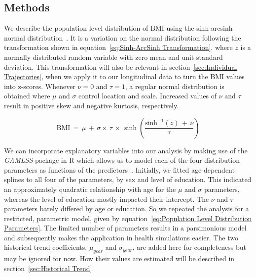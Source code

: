 \documentclass{imammb}
\numberwithin{equation}{section}
\begin{document}
\subsection{Methods}
\label{sec:Population Level Distribution/Methods}

We describe the population level distribution of BMI using the sinh-arcsinh normal distribution~\citep{Jones2009, Jones2019}. It is a variation on the normal distribution following the transformation shown in equation~\ref{eq:Sinh-ArcSinh Transformation}, where $z$ is a normally distributed random variable with zero mean and unit standard deviation. This transformation will also be relevant in section~\ref{sec:Individual Trajectories}, when we apply it to our longitudinal data to turn the BMI values into z-scores. Whenever $\nu = 0$ and $\tau =  1$, a regular normal distribution is obtained where $\mu$ and $\sigma$ control location and scale. Increased values of $\nu$ and $\tau$ result in positive skew and negative kurtosis, respectively.

\vspace{-3mm}

\begin{equation}
\label{eq:Sinh-ArcSinh Transformation}
\text{BMI} \, = \, \mu \, + \, \sigma \times \, \tau \, \times \, \sinh \left(\frac{\text{sinh}^{-1}(z) \, + \, \nu}{\tau}\right)
\end{equation}

\vspace{1mm}

We can incorporate explanatory variables into our analysis by making use of the \textit{GAMLSS} package in R which allows us to model each of the four distribution parameters as functions of the predictors~\citep{Rigby2005, Stasinopoulos2007, R2021}. Initially, we fitted age-dependent splines to all four of the parameters, by sex and level of education. This indicated an approximately quadratic relationship with age for the $\mu$ and $\sigma$ parameters, whereas the level of education mostly impacted their intercept. The $\nu$ and $\tau$ parameters barely differed by age or education. So we repeated the analysis for a restricted, parametric model, given by equation~\ref{eq:Population Level Distribution Parameters}. The limited number of parameters results in a parsimonious model and subsequently makes the application in health simulations easier. The two historical trend coefficients, $\mu_{year}$ and $\sigma_{year}$, are added here for completeness but may be ignored for now. How their values are estimated will be described in section~\ref{sec:Historical Trend}.
\end{document}

